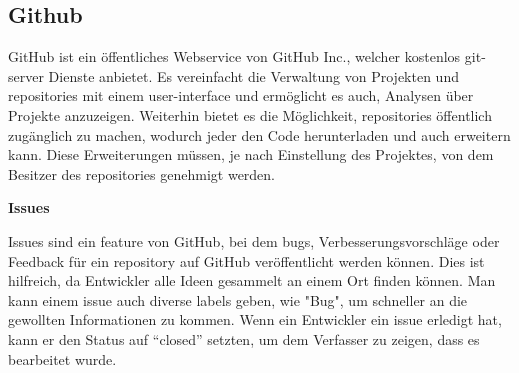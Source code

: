 \renewcommand{\kapitelautor}{Autor: Felix Zwickelstorfer}
\subsection{Github}\label{subsec:github}

GitHub ist ein öffentliches Webservice von GitHub Inc., welcher kostenlos git-server Dienste anbietet.
Es vereinfacht die Verwaltung von Projekten und repositories mit einem user-interface und ermöglicht es auch, Analysen über Projekte anzuzeigen.
Weiterhin bietet es die Möglichkeit, repositories öffentlich zugänglich zu machen, wodurch jeder den Code herunterladen und auch erweitern kann.
Diese Erweiterungen müssen, je nach Einstellung des Projektes, von dem Besitzer des repositories genehmigt werden.

\renewcommand{\kapitelautor}{Autor: Felix Zwickelstorfer}
\textbf{Issues}

Issues sind ein feature von GitHub, bei dem bugs, Verbesserungsvorschläge oder Feedback für ein repository auf GitHub veröffentlicht werden können.
Dies ist hilfreich, da Entwickler alle Ideen gesammelt an einem Ort finden können.
Man kann einem issue auch diverse labels geben, wie \zB "Bug", um schneller an die gewollten Informationen zu kommen.
Wenn ein Entwickler ein issue erledigt hat, kann er den Status auf ``closed'' setzten, um dem Verfasser zu zeigen, dass es bearbeitet wurde.
